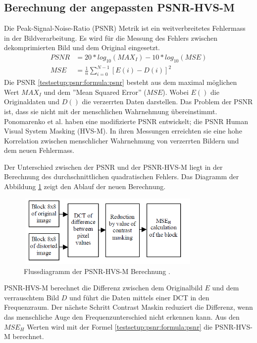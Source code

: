 \subsection{Berechnung der angepassten PSNR-HVS-M}\label{testsetup:psnr}
Die Peak-Signal-Noise-Ratio (PSNR) Metrik ist ein weitverbreitetes Fehlermass in der Bildverarbeitung. Es wird für die Messung des Fehlers zwischen dekomprimierten Bild und dem Original eingesetzt. 
\begin{equation} \label{testsetup:psnr:formula:psnr}
\begin{split}
PSNR & = 20 * log_{10}(MAX_I) - 10*log_{10}(MSE) \\
MSE & = \frac{1}{n}\sum_{i=0}^{N-1}[E(i)-D(i)]^2
\end{split}
\end{equation}
Die PSNR \eqref{testsetup:psnr:formula:psnr} besteht aus dem maximal möglichen Wert $MAX_I$ und dem ''Mean Squared Error'' ($MSE$). Wobei $E()$ die Originaldaten und $D()$ die verzerrten Daten darstellen. Das Problem der PSNR ist, dass sie nicht mit der menschlichen Wahrnehmung übereinstimmt. Ponomarenko et al.  \cite{ponomarenko2007between:psnr} haben eine modifizierte PSNR entwickelt; die PSNR Human Visual System Masking (HVS-M). In ihren Messungen erreichten sie eine hohe Korrelation zwischen menschlicher Wahrnehmung von verzerrten Bildern und dem neuen Fehlermass.

Der Unterschied zwischen der PSNR und der PSNR-HVS-M liegt in der Berechnung des durchschnittlichen quadratischen Fehlers. Das Diagramm der Abbildung \ref{testsetup:ablauf:psnr:flowchart} zeigt den Ablauf der neuen Berechnung.\\
\begin{figure}[!htbp]
	\center
	\includegraphics[width=0.8\textwidth,height=3.5cm,keepaspectratio]{./pictures/testsetup/psnr-hvs-m-flow.png}
	\caption{Flussdiagramm der PSNR-HVS-M Berechnung \cite{ponomarenko2007between:psnr}.}
	\label{testsetup:ablauf:psnr:flowchart}
\end{figure}
PSNR-HVS-M berechnet die Differenz zwischen dem Originalbild $E$ und dem verrauschtem Bild $D$ und führt die Daten mittels einer DCT in den Frequenzraum. Der nächste Schritt Contrast Maskin reduziert die Differenz, wenn das menschliche Auge den Frequenzunterschied nicht erkennen kann. Aus den $MSE_H$ Werten wird mit der Formel \eqref{testsetup:psnr:formula:psnr} die PSNR-HVS-M berechnet.

